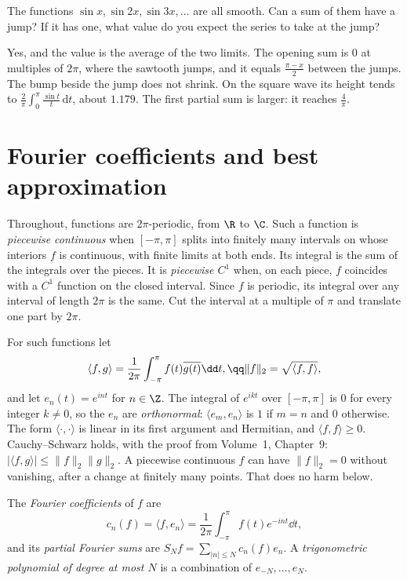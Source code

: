\begin{think}
The functions $\sin x,\sin 2x,\sin 3x,\dots$ are all smooth. Can a sum of them have a jump? If it has one, what value do you expect the series to take at the jump?
\end{think}

Yes, and the value is the average of the two limits. The opening sum is $0$ at multiples of $2\pi$, where the sawtooth jumps, and it equals $\frac{\pi-x}2$ between the jumps. The bump beside the jump does not shrink. On the square wave its height tends to $\frac2\pi\int_0^\pi\frac{\sin t}t\,\mathrm dt$, about $1.179$. The first partial sum is larger: it reaches $\frac4\pi$.

\section{Fourier coefficients and best approximation}

Throughout, functions are $2\pi$-periodic, from $\R$ to $\C$. Such a function is \emph{piecewise continuous} when $[-\pi,\pi]$ splits into finitely many intervals on whose interiors $f$ is continuous, with finite limits at both ends. Its integral is the sum of the integrals over the pieces. It is \emph{piecewise $C^1$} when, on each piece, $f$ coincides with a $C^1$ function on the closed interval. Since $f$ is periodic, its integral over any interval of length $2\pi$ is the same. Cut the interval at a multiple of $\pi$ and translate one part by $2\pi$.

For such functions let
\[
\begin{gathered}\langle f,g\rangle=\frac1{2\pi}\int_{-\pi}^\pi f(t)\overline{g(t)}\dd t,\qq\|f\|_2=\sqrt{\langle f,f\rangle},\end{gathered}
\]
and let $e_n(t)=e^{int}$ for $n\in\Z$. The integral of $e^{ikt}$ over $[-\pi,\pi]$ is $0$ for every integer $k\ne0$, so the $e_n$ are \emph{orthonormal}: $\langle e_m,e_n\rangle$ is $1$ if $m=n$ and $0$ otherwise. The form $\langle\cdot,\cdot\rangle$ is linear in its first argument and Hermitian, and $\langle f,f\rangle\ge0$. Cauchy--Schwarz holds, with the proof from Volume~1, Chapter~9: $|\langle f,g\rangle|\le\|f\|_2\|g\|_2$. A piecewise continuous $f$ can have $\|f\|_2=0$ without vanishing, after a change at finitely many points. That does no harm below.

\begin{definition}
The \emph{Fourier coefficients} of $f$ are
\[
c_n(f)=\langle f,e_n\rangle=\frac1{2\pi}\int_{-\pi}^\pi f(t)e^{-int}\dd t,
\]
and its \emph{partial Fourier sums}
are $S_Nf=\sum_{|n|\le N}c_n(f)e_n$. A \emph{trigonometric polynomial of degree at most $N$} is a combination of $e_{-N},\dots,e_N$.
\end{definition}

